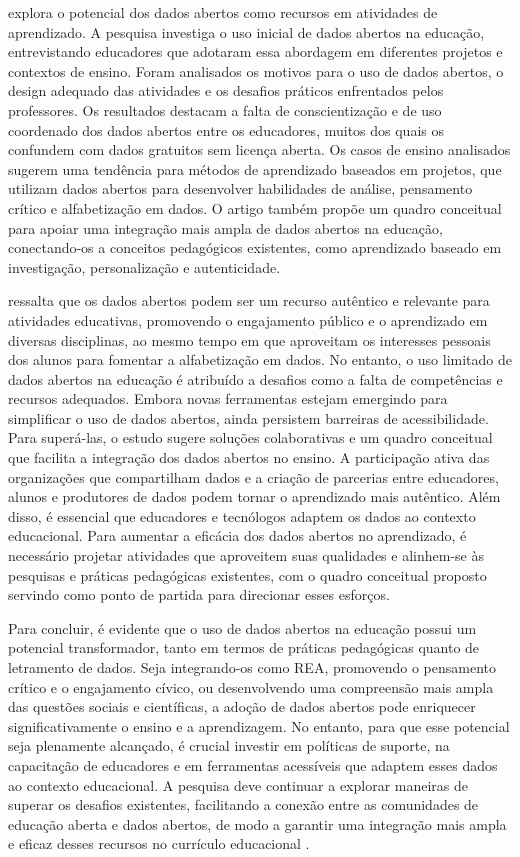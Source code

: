 \documentclass[portuguese]{textolivre}
\begin{document}
\textcite{coughlan2019} explora o potencial dos dados abertos como recursos em atividades de aprendizado. A pesquisa investiga o uso inicial de dados abertos na educação, entrevistando educadores que adotaram essa abordagem em diferentes projetos e contextos de ensino. Foram analisados os motivos para o uso de dados abertos, o design adequado das atividades e os desafios práticos enfrentados pelos professores. Os resultados destacam a falta de conscientização e de uso coordenado dos dados abertos entre os educadores, muitos dos quais os confundem com dados gratuitos sem licença aberta. Os casos de ensino analisados sugerem uma tendência para métodos de aprendizado baseados em projetos, que utilizam dados abertos para desenvolver habilidades de análise, pensamento crítico e alfabetização em dados. O artigo também propõe um quadro conceitual para apoiar uma integração mais ampla de dados abertos na educação, conectando-os a conceitos pedagógicos existentes, como aprendizado baseado em investigação, personalização e autenticidade. 

\textcite{coughlan2019} ressalta que os dados abertos podem ser um recurso autêntico e relevante para atividades educativas, promovendo o engajamento público e o aprendizado em diversas disciplinas, ao mesmo tempo em que aproveitam os interesses pessoais dos alunos para fomentar a alfabetização em dados. No entanto, o uso limitado de dados abertos na educação é atribuído a desafios como a falta de competências e recursos adequados. Embora novas ferramentas estejam emergindo para simplificar o uso de dados abertos, ainda persistem barreiras de acessibilidade. Para superá-las, o estudo sugere soluções colaborativas e um quadro conceitual que facilita a integração dos dados abertos no ensino. A participação ativa das organizações que compartilham dados e a criação de parcerias entre educadores, alunos e produtores de dados podem tornar o aprendizado mais autêntico. Além disso, é essencial que educadores e tecnólogos adaptem os dados ao contexto educacional. Para aumentar a eficácia dos dados abertos no aprendizado, é necessário projetar atividades que aproveitem suas qualidades e alinhem-se às pesquisas e práticas pedagógicas existentes, com o quadro conceitual proposto servindo como ponto de partida para direcionar esses esforços.

Para concluir, é evidente que o uso de dados abertos na educação possui um potencial transformador, tanto em termos de práticas pedagógicas quanto de letramento de dados. Seja integrando-os como REA, promovendo o pensamento crítico e o engajamento cívico, ou desenvolvendo uma compreensão mais ampla das questões sociais e científicas, a adoção de dados abertos pode enriquecer significativamente o ensino e a aprendizagem. No entanto, para que esse potencial seja plenamente alcançado, é crucial investir em políticas de suporte, na capacitação de educadores e em ferramentas acessíveis que adaptem esses dados ao contexto educacional. A pesquisa deve continuar a explorar maneiras de superar os desafios existentes, facilitando a conexão entre as comunidades de educação aberta e dados abertos, de modo a garantir uma integração mais ampla e eficaz desses recursos no currículo educacional \cite{atenas2015,bhargava2015,atenas2019,coughlan2019,lima-lopes2022,lima-lopes2023}.
\end{document}

